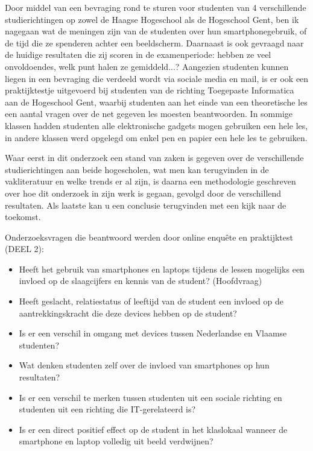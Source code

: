 Door middel van een bevraging rond te sturen voor studenten van 4 verschillende studierichtingen op zowel de Haagse Hogeschool als de Hogeschool Gent, ben ik nagegaan wat de meningen zijn van de studenten over hun smartphonegebruik, of de tijd die ze spenderen achter een beeldscherm. Daarnaast is ook gevraagd naar de huidige resultaten die zij scoren in de examenperiode: hebben ze veel onvoldoendes, welk punt halen ze gemiddeld...? Aangezien studenten kunnen liegen in een bevraging die verdeeld wordt via sociale media en mail, is er ook een praktijktestje uitgevoerd bij studenten van de richting Toegepaste Informatica aan de Hogeschool Gent, waarbij studenten aan het einde van een theoretische les een aantal vragen over de net gegeven les moesten beantwoorden. In sommige klassen hadden studenten alle elektronische gadgets mogen gebruiken een hele les, in andere klassen werd opgelegd om enkel pen en papier een hele les te gebruiken.

Waar eerst in dit onderzoek een stand van zaken is gegeven over de verschillende studierichtingen aan beide hogescholen, wat men kan terugvinden in de vakliteratuur en welke trends er al zijn, is daarna een methodologie geschreven over hoe dit onderzoek in zijn werk is gegaan, gevolgd door de verschillend resultaten. Als laatste kan u een conclusie terugvinden met een kijk naar de toekomst.

Onderzoeksvragen die beantwoord werden door online enquête en praktijktest (DEEL 2):
\begin{itemize}
	\item Heeft het gebruik van smartphones en laptops tijdens de lessen mogelijks een invloed op de slaagcijfers en kennis van de student? (Hoofdvraag)
	\item Heeft geslacht, relatiestatus of leeftijd van de student een invloed op de aantrekkingskracht die deze devices hebben op de student?
	\item Is er een verschil in omgang met devices tussen Nederlandse en Vlaamse studenten?
	\item Wat denken studenten zelf over de invloed van smartphones op hun resultaten?
	\item Is er een verschil te merken tussen studenten uit een sociale richting en studenten uit een richting die IT-gerelateerd is?
	\item Is er een direct positief effect op de student in het klaslokaal wanneer de smartphone en laptop volledig uit beeld verdwijnen?
\end{itemize}

